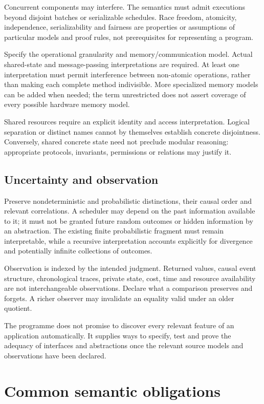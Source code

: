 \documentclass[11pt,a4paper]{article}
\begin{document}
Concurrent components may interfere. The semantics must admit executions beyond disjoint batches or serializable schedules. Race freedom, atomicity, independence, serializability and fairness are properties or assumptions of particular models and proof rules, not prerequisites for representing a program.

Specify the operational granularity and memory/communication model. Actual shared-state and message-passing interpretations are required. At least one interpretation must permit interference between non-atomic operations, rather than making each complete method indivisible. More specialized memory models can be added when needed; the term unrestricted does not assert coverage of every possible hardware memory model.

Shared resources require an explicit identity and access interpretation. Logical separation or distinct names cannot by themselves establish concrete disjointness. Conversely, shared concrete state need not preclude modular reasoning: appropriate protocols, invariants, permissions or relations may justify it.

\subsection{Uncertainty and observation}
Preserve nondeterministic and probabilistic distinctions, their causal order and relevant correlations. A scheduler may depend on the past information available to it; it must not be granted future random outcomes or hidden information by an abstraction. The existing finite probabilistic fragment must remain interpretable, while a recursive interpretation accounts explicitly for divergence and potentially infinite collections of outcomes.

Observation is indexed by the intended judgment. Returned values, causal event structure, chronological traces, private state, cost, time and resource availability are not interchangeable observations. Declare what a comparison preserves and forgets. A richer observer may invalidate an equality valid under an older quotient.

The programme does not promise to discover every relevant feature of an application automatically. It supplies ways to specify, test and prove the adequacy of interfaces and abstractions once the relevant source models and observations have been declared.

\section{Common semantic obligations}\label{sec:semantic}
\end{document}

